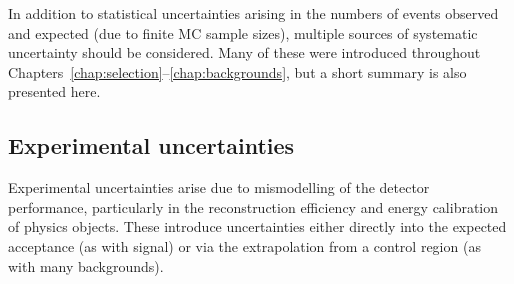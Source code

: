 
In addition to statistical uncertainties arising in the numbers of events observed and 
expected (due to finite MC sample sizes), multiple sources of systematic uncertainty should 
be considered. Many of these were introduced throughout 
Chapters~\ref{chap:selection}--\ref{chap:backgrounds}, but a short summary is also presented 
here.



\subsection{Experimental uncertainties}
\label{sec:syst:exp}

Experimental uncertainties arise due to mismodelling of the detector performance, 
particularly in the reconstruction efficiency and energy calibration of physics objects. 
These introduce uncertainties either directly into the expected acceptance (as with signal) 
or via the extrapolation from a control region (as with many backgrounds).

